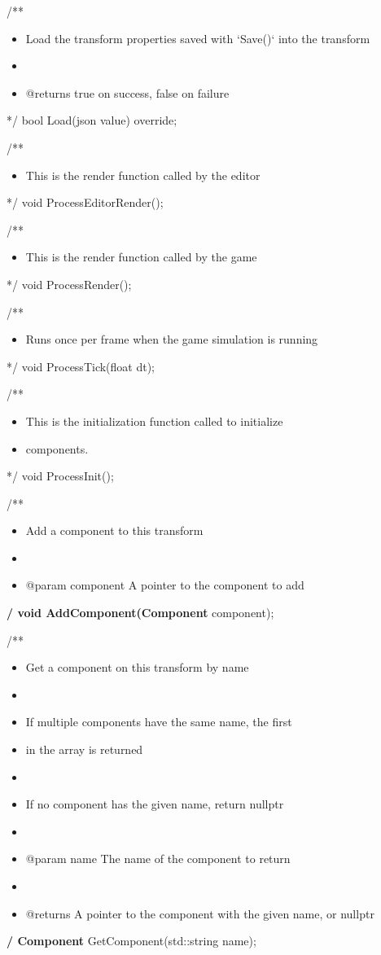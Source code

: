 \documentclass[11pt]{article}
\begin{document}
/**
\begin{itemize}
\item Load the transform properties saved with `Save()` into the transform
\item 

\item @returns true on success, false on failure
\end{itemize}
 */
bool Load(json value) override;

/**
\begin{itemize}
\item This is the render function called by the editor
\end{itemize}
 */
void ProcessEditorRender();

/**
\begin{itemize}
\item This is the render function called by the game
\end{itemize}
 */
void ProcessRender();

/**
\begin{itemize}
\item Runs once per frame when the game simulation is running
\end{itemize}
 */
void ProcessTick(float dt);

/**
\begin{itemize}
\item This is the initialization function called to initialize
\item components.
\end{itemize}
 */  
void ProcessInit();

/**
\begin{itemize}
\item Add a component to this transform
\item 

\item @param component A pointer to the component to add
\end{itemize}
 \textbf{/  
void AddComponent(Component} component);

/**
\begin{itemize}
\item Get a component on this transform by name
\item 

\item If multiple components have the same name, the first
\item in the array is returned
\item 

\item If no component has the given name, return nullptr
\item 

\item @param name The name of the component to return
\item 

\item @returns A pointer to the component with the given name, or nullptr
\end{itemize}
 \textbf{/  
Component} GetComponent(std::string name);
\end{document}
